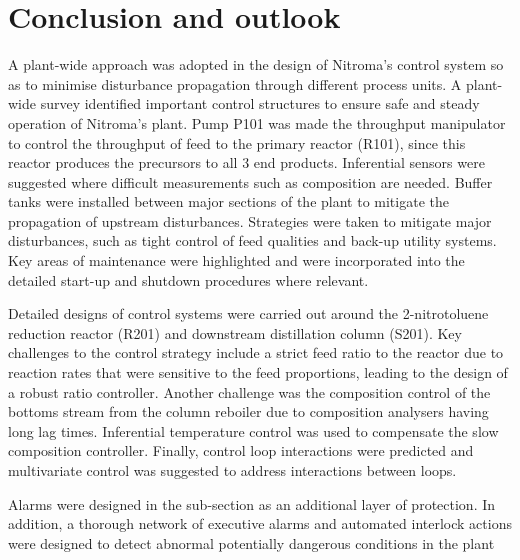 \section{Conclusion and outlook}
A plant-wide approach was adopted in the design of Nitroma's control system so as to minimise disturbance propagation through different process units. A plant-wide survey identified important control structures to ensure safe and steady operation of Nitroma's plant. Pump P101 was made the throughput manipulator to control the throughput of feed to the primary reactor (R101), since this reactor produces the precursors to all 3 end products. Inferential sensors were suggested where difficult measurements such as composition are needed. Buffer tanks were installed between major sections of the plant to mitigate the propagation of upstream disturbances. Strategies were taken to mitigate major disturbances, such as tight control of feed qualities and back-up utility systems. Key areas of maintenance were highlighted and were incorporated into the detailed start-up and shutdown procedures where relevant.

Detailed designs of control systems were carried out around the 2-nitrotoluene reduction reactor (R201) and downstream distillation column (S201). Key challenges to the control strategy include a strict feed ratio to the reactor due to reaction rates that were sensitive to the feed proportions, leading to the design of a robust ratio controller. Another challenge was the composition control of the bottoms stream from the column reboiler due to composition analysers having long lag times. Inferential temperature control was used to compensate the slow composition controller. Finally, control loop interactions were predicted and multivariate control was suggested to address interactions between loops.  

Alarms were designed in the sub-section as an additional layer of protection. In addition, a thorough network of executive alarms and automated interlock actions were designed to detect abnormal potentially dangerous conditions in the plant  